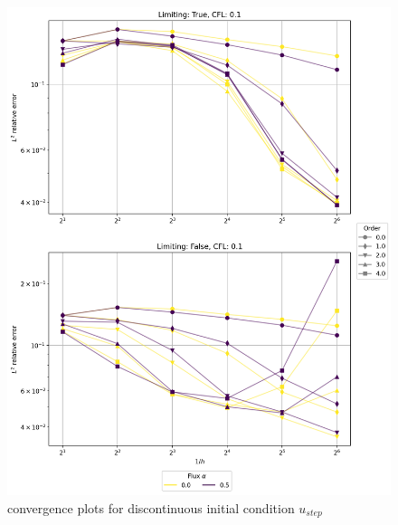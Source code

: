 \begin{figure}[p!]
	\centering
	\includegraphics[width=1.1\textwidth]{../figs/parametric/advection_1D/advection_1D_step_reduced.png}
	\caption{ convergence plots for discontinuous initial 
	condition $u_{step}$}
	\label{fig:adv_conv_1D_step}
\end{figure}
